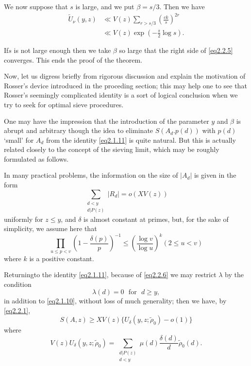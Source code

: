 We now suppose that $s$ is large, and we put $\beta=s/3$. Then we have 
\begin{align*}
  \tilde{U}_\nu(y,z) &\ll V(z) \sum_{r > s/3} \left(\frac{ck}{s}\right)^{2r}\\
  &\ll V(z) \exp \left(- \frac{s}{2} \log s\right).
\end{align*}

If\pageoriginale $s$ is not large enough then we take $\beta$ so large that the
right side of \eqref{eq2.2.5} converges. This ends the proof of the
theorem. 

Now, let us digress briefly from rigorous discussion and explain the
motivation of Rosser's device introduced in the proceding section;
this may help one to see that Rosser's seemingly complicated identity
is a sort of logical conclusion when we try to seek for optimal sieve
procedures. 

One may have the impression that the introduction of the parameter $y$
and $\beta$ is abrupt and arbitrary though the idea to eliminate
$S(A_d.p(d))$ with $p(d)$ `small' for $A_d$ from the identity
\eqref{eq2.1.11} is quite natural. But this is actually related closely to
the concept of the sieving limit, which may be roughly formulated as
follows. 

In many practical problems, the information on the size of $|A_d|$ is
given in the form  
\begin{equation*}
  \sum_{\substack{d < y \\ d|P(z)}} |R_d| = o (XV(z))
  \tag{2.2.6}\label{eq2.2.6} 
\end{equation*}    
    uniformly for $z \le y$, and $\delta$ is almost constant at
    primes, but, for the sake of simplicity, we assume here that  
    \begin{equation*}
      \prod_{u \le p < v} \left(1- \frac{\delta(p)}{p}\right)^{-1} \le \left(
      \frac{\log v}{\log u}\right)^k (2 \le u < v)
      \tag{2.2.7} \label{eq2.2.7} 
    \end{equation*}    
    where $k$ is a positive constant.
    
Returning\pageoriginale to the identity \eqref{eq2.1.11}, because of
\eqref{eq2.2.6} we may
restrict $\lambda$ by the condition  
\begin{equation*}
  \lambda(d)=0  \text{~ for~ } d \ge y, \tag{2.2.8}\label{eq2.2.8}
\end{equation*}    
in addition to \eqref{eq2.1.10}, without loss of much generality; then we
have, by \eqref{eq2.2.1}, 
$$
S(A,z) \ge XV(z) \{U_\delta(y,z; \tilde{\rho}_0)- o (1)\}
$$ 
where 
$$
 V(z)U_\delta(y, z; \tilde{\rho}_0 )= \sum_{\substack{d|P(z) \\ d <
 y}} \mu (d) \frac{\delta(d)}{d} \tilde{\rho}_0(d). 
$$
    
